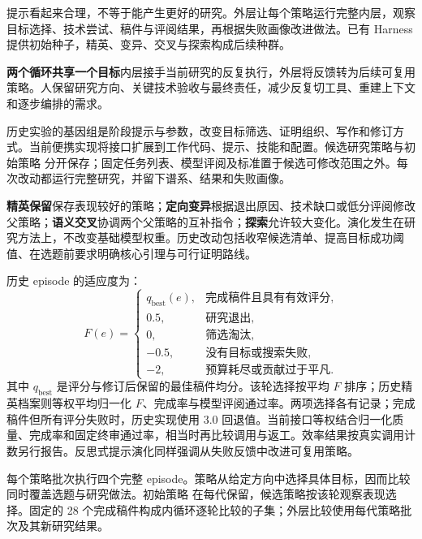 提示看起来合理，不等于能产生更好的研究。外层让每个策略运行完整内层，观察目标选择、技术尝试、稿件与评阅结果，再根据失败画像改进做法。已有 Harness 提供初始种子，精英、变异、交叉与探索构成后续种群。

\begin{insight}
\textbf{两个循环共享一个目标}\quad 内层接手当前研究的反复执行，外层将反馈转为后续可复用策略。人保留研究方向、关键技术验收与最终责任，减少反复切工具、重建上下文和逐步编排的需求。
\end{insight}

历史实验的基因组是阶段提示与参数，改变目标筛选、证明组织、写作和修订方式。当前便携实现将接口扩展到工作代码、提示、技能和配置。候选研究策略与初始策略 分开保存；固定任务列表、模型评阅及标准置于候选可修改范围之外。每次改动都运行完整研究，并留下谱系、结果和失败画像。

\textbf{精英保留}保存表现较好的策略；\textbf{定向变异}根据退出原因、技术缺口或低分评阅修改父策略；\textbf{语义交叉}协调两个父策略的互补指令；\textbf{探索}允许较大变化。演化发生在研究方法上，不改变基础模型权重。历史改动包括收窄候选清单、提高目标成功阈值、在选题前要求明确核心引理与可行证明路线。

历史 episode 的适应度为：
\[
F(e)=\begin{cases}
q_{\mathrm{best}}(e),&\text{完成稿件且具有有效评分},\\
0.5,&\text{研究退出},\\
0,&\text{筛选淘汰},\\
-0.5,&\text{没有目标或搜索失败},\\
-2,&\text{预算耗尽或贡献过于平凡}.
\end{cases}
\]
其中 $q_{\mathrm{best}}$ 是评分与修订后保留的最佳稿件均分。该轮选择按平均 $F$ 排序；历史精英档案则等权平均归一化 $F$、完成率与模型评阅通过率。两项选择各有记录；完成稿件但所有评分失败时，历史实现使用 3.0 回退值。当前接口等权结合归一化质量、完成率和固定终审通过率，相当时再比较调用与返工。效率结果按真实调用计数另行报告。反思式提示演化同样强调从失败反馈中改进可复用策略。

每个策略批次执行四个完整 episode。策略从给定方向中选择具体目标，因而比较同时覆盖选题与研究做法。初始策略 在每代保留，候选策略按该轮观察表现选择。固定的 28 个完成稿件构成内循环逐轮比较的子集；外层比较使用每代策略批次及其新研究结果。

